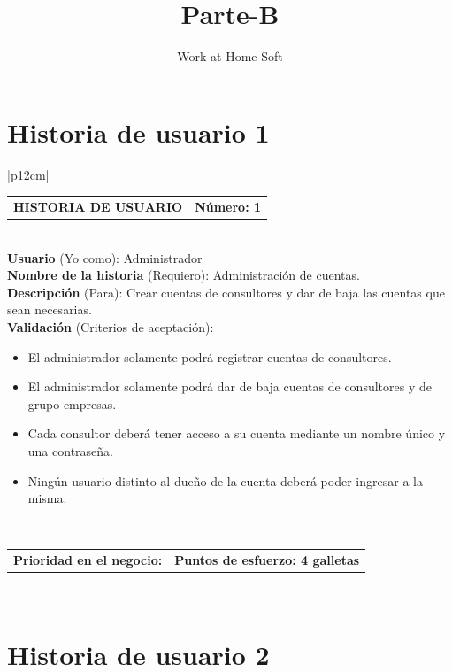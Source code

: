 \documentclass[11pt,letterpaper]{report}
\title{\Huge Parte-B}
\author{Work at Home Soft}
\begin{document}
	
	\tableofcontents
	
	\section{Historia de usuario 1}
	\begin{center}	
	\begin{tabular}{|p{12cm}|}
		\hline
		\begin{tabular}{c|c}
			\textbf{HISTORIA DE USUARIO} & \textbf{Número: 1} \\
		\end{tabular} \\ \hline
		\textbf{Usuario} (Yo como): Administrador \\ \hline
		\textbf{Nombre de la historia} (Requiero): Administración de cuentas. \\ \hline
		\textbf{Descripción} (Para): Crear cuentas de consultores y dar de baja las cuentas que sean necesarias. \\ \hline
		\textbf{Validación} (Criterios de aceptación): \\
		\begin{minipage}{12cm}
			\begin{itemize}
				\item El administrador solamente podrá registrar cuentas de consultores.
				\item El administrador solamente podrá dar de baja cuentas de consultores y de grupo empresas.
				\item Cada consultor deberá tener acceso a su cuenta mediante un nombre único y una contraseña.
				\item Ningún usuario distinto al dueño de la cuenta deberá poder ingresar a la misma.
			\end{itemize}
		\end{minipage} \\ \hline
				\begin{tabular}{p{6cm}|c}
					\textbf{Prioridad en el negocio: } & \textbf{Puntos de esfuerzo: 4 galletas} \\
				\end{tabular} \\ \hline
	\end{tabular}
	\end{center}
	
	\section{Historia de usuario 2}
	
\end{document}
